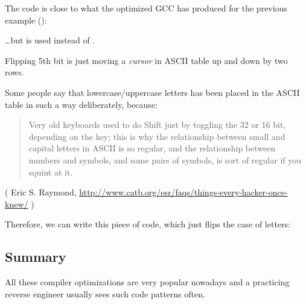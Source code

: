 

The code is close to what the optimized GCC has produced for the previous example ():



\dots but  is used instead of .

Flipping 5th bit is just moving a \textit{cursor} in \ac{ASCII} table up and down by two rows.

Some people say that lowercase/uppercase letters has been placed in the \ac{ASCII} table in such a way deliberately,
because:

\begin{framed}
\begin{quotation}
Very old keyboards used to do Shift just by toggling the 32 or 16 bit, depending on the key; this is why the relationship between small and capital letters in ASCII is so regular, and the relationship between numbers and symbols, and some pairs of symbols, is sort of regular if you squint at it.
\end{quotation}
\end{framed}

( Eric S. Raymond, \url{http://www.catb.org/esr/faqs/things-every-hacker-once-knew/} )

Therefore, we can write this piece of code, which just flips the case of letters:



\subsection{Summary}

All these compiler optimizations are very popular nowadays 
and a practicing reverse engineer usually sees such code patterns often.

